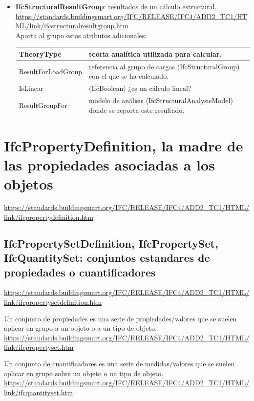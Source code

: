 \documentclass[spanish,12pt,a4paper,final,oneside]{book}
\begin{document}
\begin{itemize}
\item \textbf{IfcStructuralResultGroup}: resultados de un cálculo estructural.
\\ \url{https://standards.buildingsmart.org/IFC/RELEASE/IFC4/ADD2_TC1/HTML/link/ifcstructuralresultgroup.htm}
\\Aporta al grupo estos atributos adicionales:
\\ \begin{longtable}{|p{2.5cm} p{11cm}|}
\hline
TheoryType & teoria analítica utilizada para calcular.
\\[0.1cm] \hline
ResultForLoadGroup & referencia al grupo de cargas (IfcStructuralGroup) con el que se ha calculado.
\\[0.1cm] \hline
IsLinear & (IfcBoolean) ¿es un cálculo lineal?
\\[0.1cm] \hline
ResultGroupFor & modelo de análisis (IfcStructuralAnalysisModel) donde se reporta este resultado.
\\[0.1cm] \hline
\end{longtable}

\end{itemize}



\section{IfcPropertyDefinition, la madre de las propiedades asociadas a los objetos} \label{entidades_propiedades}
\url{https://standards.buildingsmart.org/IFC/RELEASE/IFC4/ADD2_TC1/HTML/link/ifcpropertydefinition.htm}

\subsection{IfcPropertySetDefinition, IfcPropertySet, IfcQuantitySet: conjuntos estandares de propiedades o cuantificadores}
\url{https://standards.buildingsmart.org/IFC/RELEASE/IFC4/ADD2_TC1/HTML/link/ifcpropertysetdefinition.htm}

Un conjunto de propiedades es una serie de propiedades/valores que se suelen aplicar en grupo a un objeto o a un tipo de objeto. 
\\ \url{https://standards.buildingsmart.org/IFC/RELEASE/IFC4/ADD2_TC1/HTML/link/ifcpropertyset.htm}

Un conjunto de cuantificadores es una serie de medidas/valores que se suelen aplicar en grupo sobre un objeto o un tipo de objeto.
\\ \url{https://standards.buildingsmart.org/IFC/RELEASE/IFC4/ADD2_TC1/HTML/link/ifcquantityset.htm}
\end{document}
